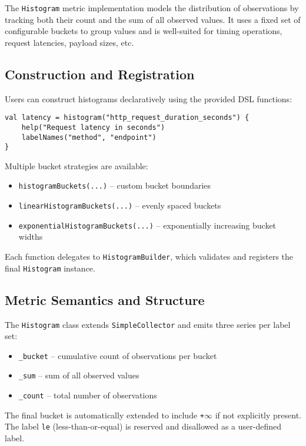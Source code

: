 The \texttt{Histogram} metric implementation models the distribution of observations by tracking both their count and the sum of all observed values. It uses a fixed set of configurable buckets to group values and is well-suited for timing operations, request latencies, payload sizes, etc.

\subsection{Construction and Registration}

Users can construct histograms declaratively using the provided DSL functions:

\begin{verbatim}
val latency = histogram("http_request_duration_seconds") {
    help("Request latency in seconds")
    labelNames("method", "endpoint")
}
\end{verbatim}

Multiple bucket strategies are available:
\begin{itemize}
    \item \texttt{histogramBuckets(...)} – custom bucket boundaries
    \item \texttt{linearHistogramBuckets(...)} – evenly spaced buckets
    \item \texttt{exponentialHistogramBuckets(...)} – exponentially increasing bucket widths
\end{itemize}

Each function delegates to \texttt{HistogramBuilder}, which validates and registers the final \texttt{Histogram} instance.

\subsection{Metric Semantics and Structure}

The \texttt{Histogram} class extends \texttt{SimpleCollector} and emits three series per label set:
\begin{itemize}
    \item \texttt{\_bucket} – cumulative count of observations per bucket
    \item \texttt{\_sum} – sum of all observed values
    \item \texttt{\_count} – total number of observations
\end{itemize}

The final bucket is automatically extended to include \texttt{+\(\infty\)} if not explicitly present. The label \texttt{le} (less-than-or-equal) is reserved and disallowed as a user-defined label.

